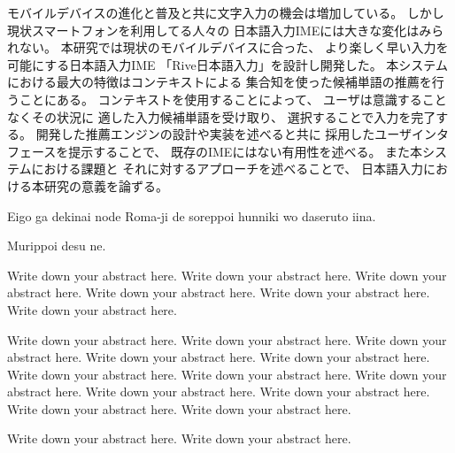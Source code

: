 


\begin{jabstract}

モバイルデバイスの進化と普及と共に文字入力の機会は増加している。
しかし現状スマートフォンを利用してる人々の
日本語入力IMEには大きな変化はみられない。
本研究では現状のモバイルデバイスに合った、
より楽しく早い入力を可能にする日本語入力IME
「Rive日本語入力」を設計し開発した。
本システムにおける最大の特徴はコンテキストによる
集合知を使った候補単語の推薦を行うことにある。
コンテキストを使用することによって、
ユーザは意識することなくその状況に
適した入力候補単語を受け取り、
選択することで入力を完了する。
開発した推薦エンジンの設計や実装を述べると共に
採用したユーザインタフェースを提示することで、
既存のIMEにはない有用性を述べる。
また本システムにおける課題と
それに対するアプローチを述べることで、
日本語入力における本研究の意義を論ずる。

\end{jabstract}

\begin{eabstract}

Eigo ga dekinai node Roma-ji de soreppoi hunniki wo daseruto iina.

Murippoi desu ne.

Write down your abstract here. Write down your abstract here. Write down your abstract here. Write down your abstract here. Write down your abstract here. Write down your abstract here.

 Write down your abstract here. Write down your abstract here. Write down your abstract here. Write down your abstract here. Write down your abstract here. Write down your abstract here. Write down your abstract here. Write down your abstract here. Write down your abstract here. Write down your abstract here. Write down your abstract here. Write down your abstract here.

Write down your abstract here. Write down your abstract here.

\end{eabstract}
